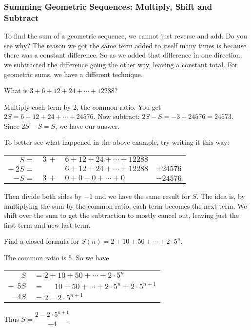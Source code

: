 \documentclass[11pt,]{book}
\theoremstyle{ptxplainnotitle}
\theoremstyle{ptxplaintitle}
\theoremstyle{ptxdefinitionnotitle}
\theoremstyle{ptxdefinitiontitle}
\theoremstyle{ptxdefinitionnotitle}
\theoremstyle{ptxdefinitiontitle}
\theoremstyle{ptxdefinitionnotitle}
\theoremstyle{ptxdefinitiontitle}
\theoremstyle{ptxdefinitiontitlenonumber}
\theoremstyle{ptxdefinitiontitlenonumber}
\numberwithin{equation}{chapter}
\newcommand{\hrulethin}  {\noalign{\hrule height 0.04em}}
\begin{document}
\subsubsection[{Summing Geometric Sequences: Multiply, Shift and Subtract}]{Summing Geometric Sequences: Multiply, Shift and Subtract}\label{subsubsection-2}
\hypertarget{p-204}{}%
To find the sum of a geometric sequence, we cannot just reverse and add. Do you see why? The reason we got the same term added to itself many times is because there was a constant difference. So as we added that difference in one direction, we subtracted the difference going the other way, leaving a constant total. For geometric sums, we have a different technique.%
\begin{example}\label{example-10}
\hypertarget{p-205}{}%
What is \(3 + 6 + 12 + 24 + \cdots + 12288\)?%
\par\smallskip%
\noindent\textbf{}\hypertarget{solution-21}{}\hypertarget{p-206}{}%
Multiply each term by 2, the common ratio. You get \(2S = 6 + 12 + 24 + \cdots + 24576\). Now subtract: \(2S - S = -3 + 24576 = 24573\). Since \(2S - S = S\), we have our answer.%
\end{example}
\hypertarget{p-207}{}%
To better see what happened in the above example, try writing it this way:%
\begin{sidebyside}{1}{0}{0}{0}
\begin{sbspanel}{1}
{\centering%
\begin{tabular}{rlll}
\(S=\)&\(3 \, +\)&\(6 + 12 + 24 + \cdots + 12288\)&\tabularnewline[0pt]
\(-~2S=\)&&\(6 + 12 + 24 + \cdots + 12288\)&\(+ 24576\)\tabularnewline\hrulethin
\(-S = \)&\(3 \, +\)&\(0 + 0 + 0 +  \cdots + 0 \)&\(-24576\)
\end{tabular}
\par}
\end{sbspanel}
\end{sidebyside}
\par
\hypertarget{p-208}{}%
Then divide both sides by \(-1\) and we have the same result for \(S\). The idea is, by multiplying the sum by the common ratio, each term becomes the next term. We shift over the sum to get the subtraction to mostly cancel out, leaving just the first term and new last term.%
\begin{example}\label{example-11}
\hypertarget{p-209}{}%
Find a closed formula for \(S(n) = 2 + 10 + 50 + \cdots + 2\cdot 5^n\).%
\par\smallskip%
\noindent\textbf{}\hypertarget{solution-22}{}\hypertarget{p-210}{}%
The common ratio is 5. So we have%
\begin{sidebyside}{1}{0}{0}{0}
\begin{sbspanel}{1}
{\centering%
\begin{tabular}{rl}
\(S\)&\(= 2 + 10 + 50 + \cdots + 2\cdot 5^n\)\tabularnewline[0pt]
\(-~~5S\)&\(= ~~~~~~10 + 50 + \cdots + 2\cdot 5^n + 2\cdot5^{n+1}\)\tabularnewline\hrulethin
\(-4S\)&\(= 2  - 2\cdot5^{n+1}\)
\end{tabular}
\par}
\end{sbspanel}
\end{sidebyside}
\par
\hypertarget{p-211}{}%
Thus \(S = \dfrac{2-2\cdot 5^{n+1}}{-4}\)%
\end{example}
\end{document}
